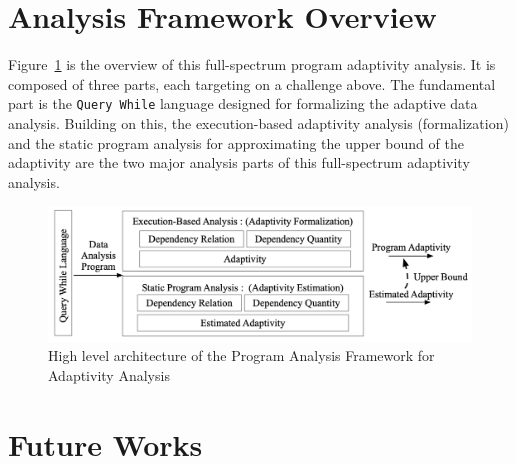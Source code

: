 \section{Analysis Framework Overview}
Figure~\ref{fig:structure} is the overview of this full-spectrum program adaptivity analysis.
It is composed of three parts, each targeting on a challenge above.
The fundamental part is the {\tt Query While} language designed for formalizing the 
adaptive data analysis. Building on this, 
the execution-based adaptivity analysis (formalization)
and the static program analysis for approximating the upper bound of the 
adaptivity are the two major analysis parts of this full-spectrum adaptivity analysis.
\begin{figure}
   \centering   
   \includegraphics[width=1.0\textwidth]{figures/overview.png}
  \caption{High level architecture of the Program Analysis Framework for Adaptivity Analysis}
   \label{fig:structure}
\end{figure}



\section{Future Works}
\label{sec:intro-cfl}
